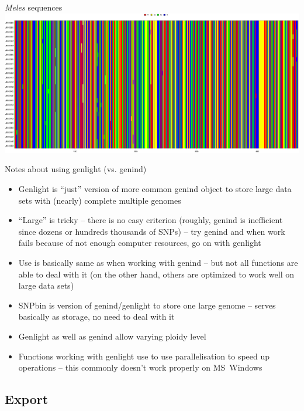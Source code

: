 \documentclass[compress, ucs, xelatex, 11pt, xcolor=svgnames,
  hyperref={
    bookmarks=true,
    unicode=true,
    colorlinks=true,
    pdftitle={Molecular data in R},
    plainpages=false,
    pdfauthor={Vojtech Zeisek},
    pdfsubject={Course about phylogeny and evolution in R},
    pdfcreator={XeLaTeX},
    pdfkeywords={R, evolution, phylogeny, molecular data},
    linkcolor=Tomato,
    anchorcolor=SaddleBrown,
    citecolor=Goldenrod,
    filecolor=DarkMagenta,
    menucolor=Sienna,
    urlcolor=DarkTurquoise,
    pdftex},
  url={hyphens, lowtilde} %
  ]{beamer}
\begin{document}
\begin{frame}{\textit{Meles} sequences}
  \includegraphics[width=\textwidth]{sequences_meles.png}
\end{frame}

\begin{frame}{Notes about using genlight (vs. genind)}
  \begin{itemize}
    \item Genlight is ``just'' version of more common genind object to store large data sets with (nearly) complete multiple genomes
    \item ``Large'' is tricky -- there is no easy criterion (roughly, genind is inefficient since dozens or hundreds thousands of SNPs) -- try genind and when work fails because of not enough computer resources, go on with genlight
    \item Use is basically same as when working with genind -- but not all functions are able to deal with it (on the other hand, others are optimized to work well on large data sets)
    \item SNPbin is version of genind/genlight to store one large genome -- serves basically as storage, no need to deal with it
    \item Genlight as well as genind allow varying ploidy level
    \item Functions working with genlight use to use parallelisation to speed up operations -- this commonly doesn't work properly on MS~Windows
  \end{itemize}
\end{frame}

\subsection{Export}
\end{document}
